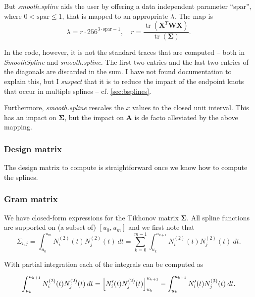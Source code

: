 \documentclass[a4paper]{scrartcl}
\newcommand{\mat}[1]{\ensuremath{\bm{#1}}}
\newcommand{\T}[1]{\ensuremath{{#1}^{T}}}
\newcommand\dd{\ensuremath{\:d}}
\DeclareMathOperator\tr{tr}
\begin{document}
But \textit{smooth.spline} aids the user by offering a data independent parameter \enquote{spar}, where $0 < \text{spar} \leq 1$, that is mapped to an appropriate $\lambda$.
The map is
\begin{equation*}
    \lambda = r\cdot 256^{3\cdot\text{spar} - 1},
    \quad
    r = \frac{\tr(\T{\mat X} \mat W \mat X)}{\tr(\mat\Sigma)}.
\end{equation*}

In the code, however, it is not the standard traces that are computed -- both in \textit{SmoothSpline} and \textit{smooth.spline}.
The first two entries and the last two entries of the diagonals are discarded in the sum.
I have not found documentation to explain this, but I \emph{suspect} that it is to reduce the impact of the endpoint knots that occur in multiple splines -- cf. \cref{sec:bsplines}.

Furthermore, \textit{smooth.spline} rescales the $x$ values to the closed unit interval.
This has an impact on $\mat\Sigma$, but the impact on $\mat A$ is de facto alleviated by the above mapping.


\subsubsection{Design matrix}

The design matrix to compute is straightforward once we know how to compute the splines.


\subsubsection{Gram matrix}

We have closed-form expressions for the Tikhonov matrix $\mat\Sigma$.
All spline functions are supported on (a subset of) $[u_0, u_m]$ and we first note that
\begin{equation}
    \label{eq:sigma_entry}
    \Sigma_{i,j}
    = \int_{u_0}^{u_m} N_i^{(2)}(t) N_j^{(2)}(t) \dd t
    = \sum_{k = 0}^{m - 1} \int_{u_k}^{u_{k+1}} N_i^{(2)}(t) N_j^{(2)}(t) \dd t.
\end{equation}

With partial integration each of the integrals can be computed as

\begin{equation*}
    \int_{u_k}^{u_{k+1}} N_i^{(2)}(t) N_j^{(2)}(t) \dd t
    = \Bigl[ N_i'(t) N_j^{(2)}(t) \Bigr]_{u_k}^{u_{k+1}} -
    \int_{u_k}^{u_{k+1}} N_i'(t) N_j^{(3)}(t) \dd t.
\end{equation*}
\end{document}
